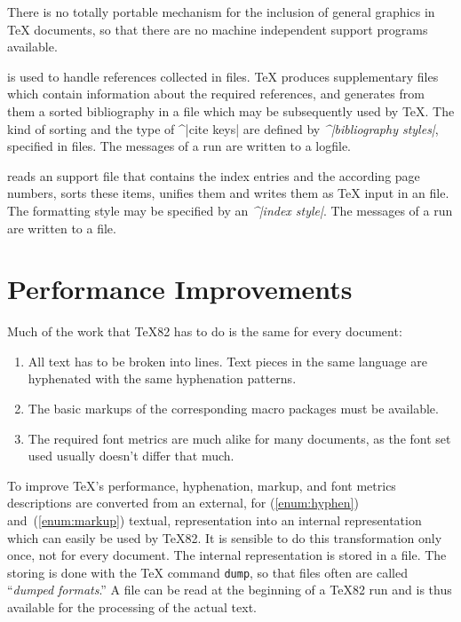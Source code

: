There is no totally portable mechanism for the inclusion of general
graphics in \TeX{} documents, so that there are no machine independent
support programs available.

\BibTeX{} is used to handle references collected in 
files. \TeX{} produces supplementary files which contain information
about the required references, and \BibTeX{} generates from them a
sorted bibliography in a  file which may be subsequently
used by \TeX{}. The kind of sorting and the type of ^|cite keys| are
defined by {\it ^|bibliography styles|\/},  specified in 
files. The messages of a \BibTeX{} run are written to a 
logfile.

\MakeIndex{} reads an  support file that contains the index
entries and the according page numbers, sorts these items, unifies
them and writes them as \TeX{} input in an  file. The
formatting style may be specified by an {\it ^|index style|}. The
messages of a \MakeIndex{} run are written to a  file.



\section{Performance Improvements}

Much of the work that \TeX82 has to do is the same for every
document:
%
 \begin{enumerate}

\item \label{enum:hyphen}
 All text has to be broken into lines. Text pieces in the same
language are hyphenated with the same hyphenation patterns.

\item \label{enum:markup}
 The basic markups of the corresponding macro packages must be
available.

\item The required font metrics are much alike for many documents, as the
font set used usually doesn't differ that much.

\end{enumerate} 
% 
 To improve \TeX{}'s performance, hyphenation, markup, and font
metrics descriptions are converted from an external, for
(\ref{enum:hyphen}) and~(\ref{enum:markup}) textual, representation
into an internal representation which can easily be used by \TeX82.
It is sensible to do this transformation only once, not for every
document. The internal representation is stored in a  file.
The storing is done with the \TeX{} command {\tt \bs{}dump}, so that
\FMT{} files often are called ``{\it dumped formats}.'' A \FMT{} file
can be read at the beginning of a \TeX82 run and is thus available
for the processing of the actual text.

